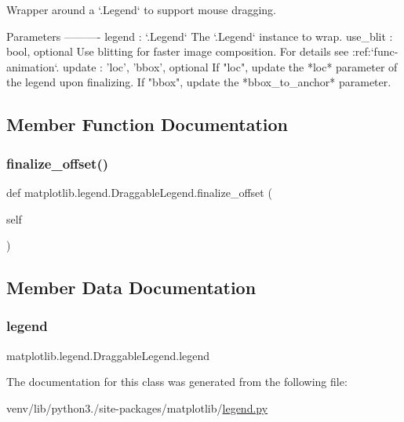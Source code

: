 \begin{DoxyVerb}Wrapper around a `.Legend` to support mouse dragging.

Parameters
----------
legend : `.Legend`
    The `.Legend` instance to wrap.
use_blit : bool, optional
    Use blitting for faster image composition. For details see
    :ref:`func-animation`.
update : {'loc', 'bbox'}, optional
    If "loc", update the *loc* parameter of the legend upon finalizing.
    If "bbox", update the *bbox_to_anchor* parameter.
\end{DoxyVerb}
 

\subsection{Member Function Documentation}
\mbox{\label{classmatplotlib_1_1legend_1_1DraggableLegend_ae0bfdd2296b614762a70eace7d0f34dd}} 
\subsubsection{\texorpdfstring{finalize\+\_\+offset()}{finalize\_offset()}}
{\footnotesize\ttfamily def matplotlib.\+legend.\+Draggable\+Legend.\+finalize\+\_\+offset (\begin{DoxyParamCaption}\item[{}]{self }\end{DoxyParamCaption})}



\subsection{Member Data Documentation}
\mbox{\label{classmatplotlib_1_1legend_1_1DraggableLegend_a3d1647186fa48f665c7708207ee9a8b5}} 
\subsubsection{\texorpdfstring{legend}{legend}}
{\footnotesize\ttfamily matplotlib.\+legend.\+Draggable\+Legend.\+legend}



The documentation for this class was generated from the following file\+:\begin{DoxyCompactItemize}
\item 
venv/lib/python3./site-\/packages/matplotlib/\hyperlink{legend_8py}{legend.\+py}\end{DoxyCompactItemize}
